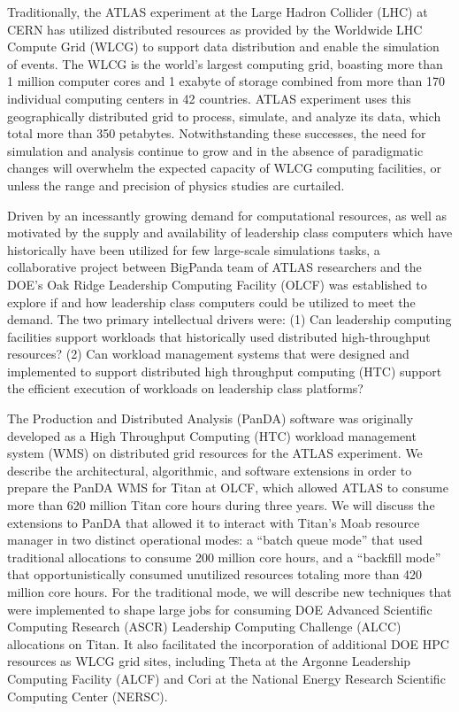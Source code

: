 


Traditionally, the ATLAS experiment at the Large Hadron Collider (LHC) at CERN
has utilized distributed resources as provided by the Worldwide LHC Compute
Grid (WLCG) to support data distribution and enable the simulation of events.
The WLCG is the world's largest computing grid, boasting more than 1 million
computer cores and 1 exabyte of storage combined from more than 170 individual
computing centers in 42 countries. ATLAS experiment uses this geographically
distributed grid to process, simulate, and analyze its data, which total more
than 350 petabytes. Notwithstanding these successes, the need for simulation
and analysis continue to grow and in the absence of paradigmatic changes will
overwhelm the expected capacity of WLCG computing facilities, or unless the
range and precision of physics studies are curtailed.

Driven by an incessantly growing demand for computational resources, as well
as motivated by the supply and availability of leadership class computers
which have historically have been utilized for few large-scale simulations
tasks, a collaborative project between BigPanda team of ATLAS researchers and
the DOE's Oak Ridge Leadership Computing Facility (OLCF) was established to
explore if and how leadership class computers could be utilized to meet the
demand. The two primary intellectual drivers were: (1) Can leadership
computing facilities support workloads that historically used distributed
high-throughput resources? (2) Can workload management systems that were
designed and implemented to support distributed high throughput computing
(HTC) support the efficient execution of workloads on leadership class
platforms?

The Production and Distributed Analysis (PanDA) software was originally
developed as a High Throughput Computing (HTC) workload management system
(WMS) on distributed grid resources for the ATLAS experiment. We describe the
architectural, algorithmic, and software extensions in order to prepare the
PanDA WMS for Titan at OLCF, which allowed ATLAS to consume more than 620
million Titan core hours during three years. We will discuss the extensions to
PanDA that allowed it to interact with Titan's Moab resource manager in two
distinct operational modes: a ``batch queue mode'' that used traditional
allocations to consume 200 million core hours, and a ``backfill mode'' that
opportunistically consumed unutilized resources totaling more than 420 million
core hours. For the traditional mode, we will describe new techniques that
were implemented to shape large jobs for consuming DOE Advanced Scientific
Computing Research (ASCR) Leadership Computing Challenge (ALCC) allocations on
Titan. It also facilitated the incorporation of additional DOE HPC resources
as WLCG grid sites, including Theta at the Argonne Leadership Computing
Facility (ALCF) and Cori at the National Energy Research Scientific Computing
Center (NERSC).



